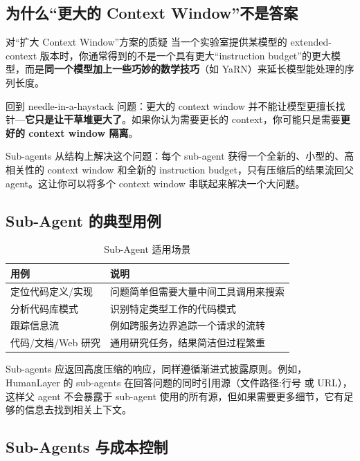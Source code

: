 \documentclass[a4paper]{article}
\begin{document}
\subsection{为什么``更大的 Context Window''不是答案}

\begin{warningbox}{对``扩大 Context Window''方案的质疑}
当一个实验室提供某模型的 extended-context 版本时，你通常得到的不是一个具有更大``instruction budget''的更大模型，而是\textbf{同一个模型加上一些巧妙的数学技巧}（如 YaRN）来延长模型能处理的序列长度。

回到 needle-in-a-haystack 问题：更大的 context window 并不能让模型更擅长找针---\textbf{它只是让干草堆更大了}。如果你认为需要更长的 context，你可能只是需要\textbf{更好的 context window 隔离}。
\end{warningbox}

Sub-agents 从结构上解决这个问题：每个 sub-agent 获得一个全新的、小型的、高相关性的 context window 和全新的 instruction budget，只有压缩后的结果流回父 agent。这让你可以将多个 context window 串联起来解决一个大问题。

\subsection{Sub-Agent 的典型用例}

\begin{table}[H]
\centering
\caption{Sub-Agent 适用场景}
\begin{tabular}{@{}p{4.5cm}p{8.5cm}@{}}
\toprule
\textbf{用例} & \textbf{说明} \\
\midrule
定位代码定义/实现 & 问题简单但需要大量中间工具调用来搜索 \\
分析代码库模式 & 识别特定类型工作的代码模式 \\
跟踪信息流 & 例如跨服务边界追踪一个请求的流转 \\
代码/文档/Web 研究 & 通用研究任务，结果简洁但过程繁重 \\
\bottomrule
\end{tabular}
\end{table}

Sub-agents 应返回高度压缩的响应，同样遵循渐进式披露原则。例如，HumanLayer 的 sub-agents 在回答问题的同时引用源（文件路径:行号 或 URL），这样父 agent 不会暴露于 sub-agent 使用的所有源，但如果需要更多细节，它有足够的信息去找到相关上下文。

\subsection{Sub-Agents 与成本控制}
\end{document}
